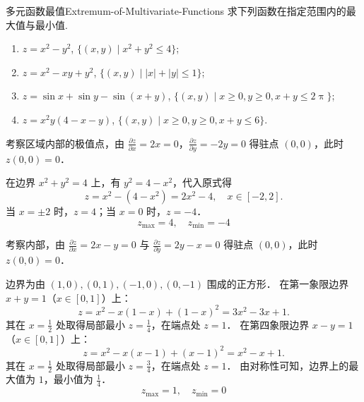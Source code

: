 \begin{problem}{多元函数最值}{Extremum-of-Multivariate-Functions}
    求下列函数在指定范围内的最大值与最小值.
    \begin{enumerate}
        \item $z = x^2 - y^2$, $\{(x, y) \mid x^2 + y^2 \le 4\}$;
        \item $z = x^2 - xy + y^2$, $\{(x, y) \mid |x| + |y| \le 1\}$;
        \item $z = \sin x + \sin y - \sin(x + y)$, $\{(x, y) \mid x \ge 0, y \ge 0, x + y \le 2 \uppi\}$;
        \item $z = x^2 y(4 - x - y)$, $\{(x, y) \mid x \ge 0, y \ge 0, x + y \le 6\}$.
    \end{enumerate}
\end{problem}

\begin{solution}
    考察区域内部的极值点，由 $\frac{\partial z}{\partial x} = 2x = 0$，$\frac{\partial z}{\partial y} = -2y = 0$ 得驻点 $(0, 0)$，此时 $z(0, 0) = 0$．

    在边界 $x^2 + y^2 = 4$ 上，有 $y^2 = 4 - x^2$，代入原式得
    \begin{equation}
        z = x^2 - (4 - x^2) = 2x^2 - 4, \quad x \in [-2, 2].
    \end{equation}
    当 $x = \pm 2$ 时，$z = 4$；当 $x = 0$ 时，$z = -4$．
    \begin{equation}
        \boxed{z_{\max} = 4, \quad z_{\min} = -4}
    \end{equation}

    考察内部，由 $\frac{\partial z}{\partial x} = 2x - y = 0$ 与 $\frac{\partial z}{\partial y} = 2y - x = 0$ 得驻点 $(0, 0)$，此时 $z(0, 0) = 0$．

    边界为由 $(1, 0), (0, 1), (-1, 0), (0, -1)$ 围成的正方形．
    在第一象限边界 $x + y = 1$（$x \in [0, 1]$）上：
    \begin{equation}
        z = x^2 - x(1 - x) + (1 - x)^2 = 3x^2 - 3x + 1.
    \end{equation}
    其在 $x = \frac{1}{2}$ 处取得局部最小 $z = \frac{1}{4}$，在端点处 $z = 1$．
    在第四象限边界 $x - y = 1$（$x \in [0, 1]$）上：
    \begin{equation}
        z = x^2 - x(x - 1) + (x - 1)^2 = x^2 - x + 1.
    \end{equation}
    其在 $x = \frac{1}{2}$ 处取得局部最小 $z = \frac{3}{4}$，在端点处 $z = 1$．
    由对称性可知，边界上的最大值为 $1$，最小值为 $\frac{1}{4}$．
    \begin{equation}
        \boxed{z_{\max} = 1, \quad z_{\min} = 0}
    \end{equation}


\end{solution}
